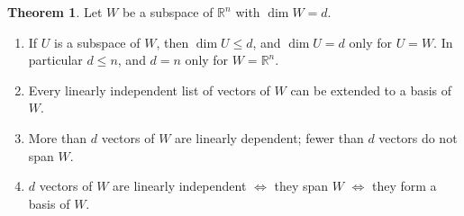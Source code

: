 \documentclass[12pt]{article}
\newcommand{\R}{\mathbb R}
\theoremstyle{definition}
\newtheorem{theorem}{Theorem}
\begin{document}
\begin{theorem}\label{b4.5}
Let \(W\) be a subspace of \(\R^n\) with \(\dim W=d\).
\begin{enumerate}
\item If \(U\) is a subspace of \(W\), then \(\dim U\leqslant d\), and \(\dim U=d\) only for \(U=W\). In particular
\(d\leqslant n\), and \(d=n\) only for \(W=\R^n\).
\item Every linearly independent list of vectors of \(W\) can be extended to a basis of \(W\).
\item More than \(d\) vectors of \(W\) are linearly dependent; fewer than \(d\) vectors do not span \(W\).
\item \(d\) vectors of \(W\) are linearly independent \(\iff\) they span \(W\) \(\iff\) they form a basis of \(W\).
\end{enumerate}
\end{theorem}
\end{document}
